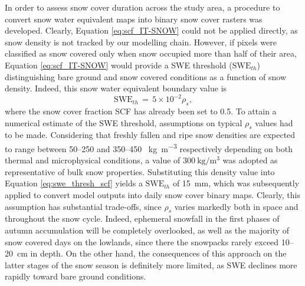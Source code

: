 In order to assess snow cover duration across the study area, a procedure to convert snow water equivalent maps into binary snow cover rasters was 
developed. Clearly, Equation \eqref{eq:scf_IT-SNOW} could not be applied directly, as snow density is not tracked by our modelling chain. 
However, if pixels were classified as snow covered only when snow occupied more than half of their area, Equation \eqref{eq:scf_IT-SNOW} would 
provide a SWE threshold ($\text{SWE}_{th}$) distinguishing bare ground and snow covered conditions as a function of snow density. Indeed, this snow water 
equivalent boundary value is 
\begin{equation}
    \text{SWE}_{th}\,=\,5 \times 10^{-2} \rho_s,
    \label{eq:swe_thresh_scf}
\end{equation}
where the snow cover fraction SCF has already been set to 0.5. To attain a numerical estimate of the SWE threshold, assumptions on 
typical $\rho_s$ values had to be made. Considering that freshly fallen and ripe snow densities are expected to range between 50--250 
and 350--450 \SI{}{\kilo\gram\per\meter\cubed} respectively depending on both thermal and microphysical conditions, a value of 
$\SI{300}{\kilo\gram\per\meter\cubed}$ was adopted as representative of bulk snow properties. Substituting this density value into 
Equation \eqref{eq:swe_thresh_scf} yields a $\text{SWE}_{th}$ of \SI{15}{\milli\meter}, which was subsequently applied to convert model outputs into 
daily snow cover binary maps. Clearly, this assumption has substantial trade-offs, since $\rho_s$ varies markedly both in space and throughout the snow 
cycle. Indeed, ephemeral snowfall in the first phases of autumn accumulation will be completely overlooked, as well as the majority of snow covered days 
on the lowlands, since there the snowpacks rarely exceed 10--\SI{20}{\centi\meter} in depth. On the other hand, the consequences of this approach on the 
latter stages of the snow season is definitely more limited, as SWE declines more rapidly toward bare ground conditions.

